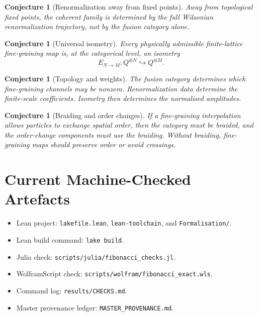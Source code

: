 \documentclass[11pt]{article}
\newtheorem{conjecture}[definition]{Conjecture}
\begin{document}
\begin{conjecture}[Renormalization away from fixed points]
Away from topological fixed points, the coherent family is determined by the
full Wilsonian renormalization trajectory, not by the fusion category alone.
\end{conjecture}

\begin{conjecture}[Universal isometry]
Every physically admissible finite-lattice fine-graining map is, at the
categorical level, an isometry
\[
E_{N\to M}:Q^{\otimes N}\hookrightarrow Q^{\otimes M}.
\]
\end{conjecture}

\begin{conjecture}[Topology and weights]
The fusion category determines which fine-graining channels may be nonzero.
Renormalization data determine the finite-scale coefficients. Isometry then
determines the normalised amplitudes.
\end{conjecture}

\begin{conjecture}[Braiding and order changes]
If a fine-graining interpolation allows particles to exchange spatial order,
then the category must be braided, and the order-change components must use
the braiding. Without braiding, fine-graining maps should preserve order or
avoid crossings.
\end{conjecture}

\section{Current Machine-Checked Artefacts}

\begin{itemize}
\item Lean project: \texttt{lakefile.lean}, \texttt{lean-toolchain}, and
\texttt{Formalisation/}.
\item Lean build command: \texttt{lake build}.
\item Julia check: \texttt{scripts/julia/fibonacci\_checks.jl}.
\item WolframScript check: \texttt{scripts/wolfram/fibonacci\_exact.wls}.
\item Command log: \texttt{results/CHECKS.md}.
\item Master provenance ledger: \texttt{MASTER\_PROVENANCE.md}.
\end{itemize}
\end{document}

